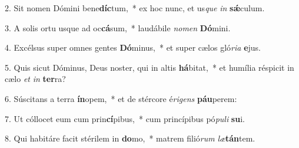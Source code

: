 2. Sit nomen Dómini bene\textbf{díc}tum,~*  ex hoc nunc, et us\textit{que} \textit{in} \textbf{sǽ}culum.\

3. A solis ortu usque ad oc\textbf{cá}sum,~*  laudábile \textit{no}\textit{men} \textbf{Dó}mini.\

4. Excélsus super omnes gentes \textbf{Dó}minus,~*  et super cælos gló\textit{ri}\textit{a} \textbf{e}jus.\

5. Quis sicut Dóminus, Deus noster, qui in altis \textbf{há}bitat,~*  et humília réspicit in cælo \textit{et} \textit{in} \textbf{ter}ra?\

6. Súscitans a terra \textbf{ín}opem,~*  et de stércore é\textit{ri}\textit{gens} \textbf{páu}perem:\

7. Ut cóllocet eum cum prin\textbf{cí}pibus,~*  cum princípibus pó\textit{pu}\textit{li} \textbf{su}i.\

8. Qui habitáre facit stérilem in \textbf{do}mo,~*  matrem filió\textit{rum} \textit{læ}\textbf{tán}tem.\

